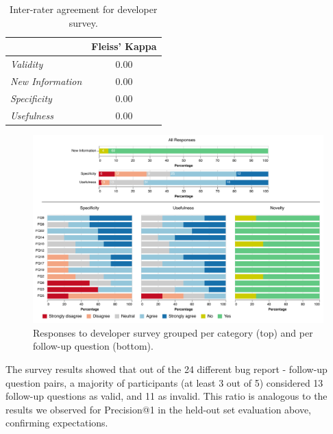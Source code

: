 \begin{table}[t]
\centering
\caption{Inter-rater agreement for developer survey.}
\begin{tabular}{p{3cm}c}
\hline
                          & {\bf Fleiss' Kappa}   \\\hline
{\em Validity}                & 0.00  \\
{\em New Information}         & 0.00  \\
{\em Specificity}             & 0.00  \\
{\em Usefulness}              & 0.00  \\ \hline
\end{tabular}
\label{tab:kappa}
\end{table}

\begin{figure}[t]
\centering
\includegraphics[width=0.99\linewidth]{figures/viz_group.pdf}
\caption{Responses to developer survey grouped per category (top) and per follow-up question (bottom).}
\label{fig:survey}
\end{figure}

The survey results showed that out of the 24 different bug report - follow-up question pairs, a majority of participants (at least 3 out of 5) considered 13 follow-up questions as valid, and 11 as invalid. This ratio is analogous to the results we observed for Precision@1 in the held-out set evaluation above, confirming expectations.

